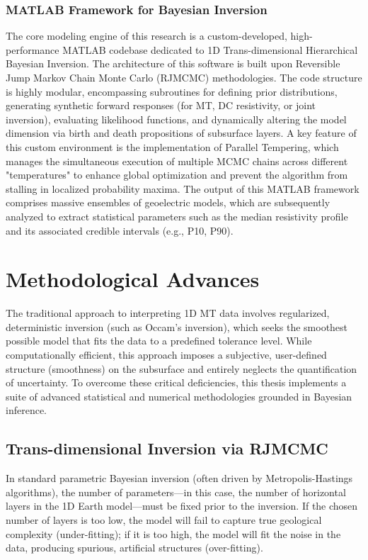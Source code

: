\subsubsection{MATLAB Framework for Bayesian Inversion}
The core modeling engine of this research is a custom-developed, high-performance MATLAB codebase dedicated to 1D Trans-dimensional Hierarchical Bayesian Inversion. The architecture of this software is built upon Reversible Jump Markov Chain Monte Carlo (RJMCMC) methodologies. The code structure is highly modular, encompassing subroutines for defining prior distributions, generating synthetic forward responses (for MT, DC resistivity, or joint inversion), evaluating likelihood functions, and dynamically altering the model dimension via birth and death propositions of subsurface layers. A key feature of this custom environment is the implementation of Parallel Tempering, which manages the simultaneous execution of multiple MCMC chains across different "temperatures" to enhance global optimization and prevent the algorithm from stalling in localized probability maxima. The output of this MATLAB framework comprises massive ensembles of geoelectric models, which are subsequently analyzed to extract statistical parameters such as the median resistivity profile and its associated credible intervals (e.g., P10, P90).


\section{Methodological Advances}

The traditional approach to interpreting 1D MT data involves regularized, deterministic inversion (such as Occam's inversion), which seeks the smoothest possible model that fits the data to a predefined tolerance level. While computationally efficient, this approach imposes a subjective, user-defined structure (smoothness) on the subsurface and entirely neglects the quantification of uncertainty. To overcome these critical deficiencies, this thesis implements a suite of advanced statistical and numerical methodologies grounded in Bayesian inference.

\subsection{Trans-dimensional Inversion via RJMCMC}
In standard parametric Bayesian inversion (often driven by Metropolis-Hastings algorithms), the number of parameters—in this case, the number of horizontal layers in the 1D Earth model—must be fixed prior to the inversion. If the chosen number of layers is too low, the model will fail to capture true geological complexity (under-fitting); if it is too high, the model will fit the noise in the data, producing spurious, artificial structures (over-fitting). 

